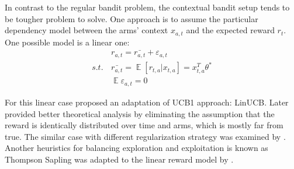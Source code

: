 \documentclass[a4paper]{article}
\DeclareMathOperator{\E}{\mathop{\mathbb{E}}}
\begin{document}
In contrast to the regular bandit problem, the contextual bandit setup tends to be tougher problem to solve. One approach is to assume the particular dependency model between the arms' context $x_{a,t}$ and the expected reward $r_t$. One possible model is a linear one: \begin{align}
        &\label{eq:reward_linear_assumption}
        r_{a,t} = \bar{r_{a,t}} + \varepsilon_{a,t} \\
        s.t.\, & \bar{r_{a,t}}  = \E[r_{t,a}|x_{t,a}] = x_{t,a}^T\theta^* \\
        & \E \varepsilon_{a,t}  = 0 
    \end{align}
    
    For this linear case \cite{Li2010} proposed an adaptation of UCB1 approach: LinUCB. Later \cite{Abbasi-Yadkori2011} provided better theoretical analysis by eliminating the assumption that the reward is identically distributed over time and arms, which is mostly far from true. The similar case with different regularization strategy was examined by \cite{Auer2003}. Another heuristics for balancing exploration and exploitation is known as Thompson Sapling was adapted to the linear reward model by \cite{Agrawal2013}. 



\end{document}
